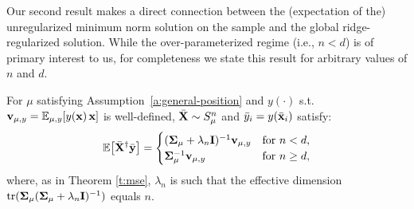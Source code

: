 \documentclass[11pt]{article}
\begin{document}
Our second result makes a direct connection between the (expectation
of the) unregularized minimum norm solution on the sample
and the global ridge-regularized solution.
While the over-parameterized regime (i.e., $n<d$) is of primary interest to us,
for completeness we state this result for arbitrary values of $n$ and $d$.
\begin{theorem}
  \label{t:unbiased}
  For $\mu$ satisfying
  Assumption~\ref{a:general-position} and
  $y(\cdot)$ s.t.~$\mathbf v_{\mu,y}=\mathbb E_{\mu,y}[y(\mathbf x)\,\mathbf x]$ is well-defined,
  ${\bar{\mathbf X}}\sim S_\mu^n$
  and ${\bar y}_i=y(\bar{\mathbf x}_i)$ satisfy:
  \begin{align*}
    \mathbb E\big[{\bar{\mathbf X}}^\dagger\bar{\mathbf y}\big] =
    \begin{cases}
      (\mathbf{\Sigma}_\mu + \lambda_n\mathbf I)^{-1}\mathbf v_{\mu,y} & \text{for }n<d,     \\
      \mathbf{\Sigma}_\mu^{-1}\mathbf v_{\mu,y}                 & \text{for }n \ge d,
    \end{cases}
  \end{align*}
  where, as in Theorem \ref{t:mse}, $\lambda_n$ is such that the effective dimension
  $\mathrm{tr}(\mathbf{\Sigma}_\mu(\mathbf{\Sigma}_\mu+\lambda_n\mathbf I)^{-1})$ equals $n$.
\end{theorem}
\end{document}
